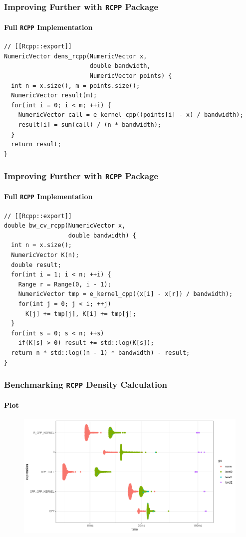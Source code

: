 \documentclass[aspectratio=169]{beamer}
\begin{document}
\begin{frame}[fragile]
  \frametitle{Improving Further with \texttt{RCPP} Package}
  \framesubtitle{Full \texttt{RCPP} Implementation}  
\begin{verbatim}
// [[Rcpp::export]]
NumericVector dens_rcpp(NumericVector x,
                        double bandwidth,
                        NumericVector points) {
  int n = x.size(), m = points.size();
  NumericVector result(m);
  for(int i = 0; i < m; ++i) {
    NumericVector call = e_kernel_cpp((points[i] - x) / bandwidth);
    result[i] = sum(call) / (n * bandwidth);
  }
  return result;
}
\end{verbatim}
\end{frame}
\begin{frame}[fragile]
  \frametitle{Improving Further with \texttt{RCPP} Package}
  \framesubtitle{Full \texttt{RCPP} Implementation}
\begin{verbatim}
// [[Rcpp::export]]
double bw_cv_rcpp(NumericVector x,
                  double bandwidth) {
  int n = x.size();
  NumericVector K(n);
  double result;
  for(int i = 1; i < n; ++i) {
    Range r = Range(0, i - 1);
    NumericVector tmp = e_kernel_cpp((x[i] - x[r]) / bandwidth);
    for(int j = 0; j < i; ++j)
      K[j] += tmp[j], K[i] += tmp[j];
  }
  for(int s = 0; s < n; ++s)
    if(K[s] > 0) result += std::log(K[s]);
  return n * std::log((n - 1) * bandwidth) - result;
}
\end{verbatim}
\end{frame}
\begin{frame}
  \frametitle{Benchmarking \texttt{RCPP} Density Calculation}
  \framesubtitle{Plot}
  \begin{figure}
    \centering
    \includegraphics[scale = 0.5]{figure/RcppVsRDens.png}  
  \end{figure}
\end{frame}
\end{document}
